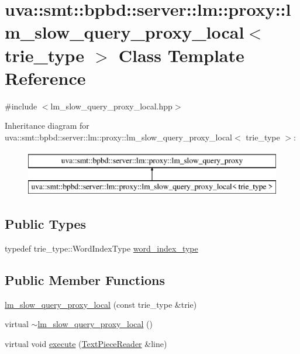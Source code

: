 \hypertarget{classuva_1_1smt_1_1bpbd_1_1server_1_1lm_1_1proxy_1_1lm__slow__query__proxy__local}{}\section{uva\+:\+:smt\+:\+:bpbd\+:\+:server\+:\+:lm\+:\+:proxy\+:\+:lm\+\_\+slow\+\_\+query\+\_\+proxy\+\_\+local$<$ trie\+\_\+type $>$ Class Template Reference}
\label{classuva_1_1smt_1_1bpbd_1_1server_1_1lm_1_1proxy_1_1lm__slow__query__proxy__local}


{\ttfamily \#include $<$lm\+\_\+slow\+\_\+query\+\_\+proxy\+\_\+local.\+hpp$>$}

Inheritance diagram for uva\+:\+:smt\+:\+:bpbd\+:\+:server\+:\+:lm\+:\+:proxy\+:\+:lm\+\_\+slow\+\_\+query\+\_\+proxy\+\_\+local$<$ trie\+\_\+type $>$\+:\begin{figure}[H]
\begin{center}
\leavevmode
\includegraphics[height=2.000000cm]{classuva_1_1smt_1_1bpbd_1_1server_1_1lm_1_1proxy_1_1lm__slow__query__proxy__local}
\end{center}
\end{figure}
\subsection*{Public Types}
\begin{DoxyCompactItemize}
\item 
typedef trie\+\_\+type\+::\+Word\+Index\+Type \hyperlink{classuva_1_1smt_1_1bpbd_1_1server_1_1lm_1_1proxy_1_1lm__slow__query__proxy__local_a9c369473af9995e492a2101b03bfe5fe}{word\+\_\+index\+\_\+type}
\end{DoxyCompactItemize}
\subsection*{Public Member Functions}
\begin{DoxyCompactItemize}
\item 
\hyperlink{classuva_1_1smt_1_1bpbd_1_1server_1_1lm_1_1proxy_1_1lm__slow__query__proxy__local_a89e685540326c3dd02974505a372b8ee}{lm\+\_\+slow\+\_\+query\+\_\+proxy\+\_\+local} (const trie\+\_\+type \&trie)
\item 
virtual \hyperlink{classuva_1_1smt_1_1bpbd_1_1server_1_1lm_1_1proxy_1_1lm__slow__query__proxy__local_a12094e9ebe7122ca9924eb67a93ed576}{$\sim$lm\+\_\+slow\+\_\+query\+\_\+proxy\+\_\+local} ()
\item 
virtual void \hyperlink{classuva_1_1smt_1_1bpbd_1_1server_1_1lm_1_1proxy_1_1lm__slow__query__proxy__local_a4f99e9494c15f2b30ee1837a887dfd0c}{execute} (\hyperlink{classuva_1_1utils_1_1file_1_1_text_piece_reader}{Text\+Piece\+Reader} \&line)
\end{DoxyCompactItemize}

